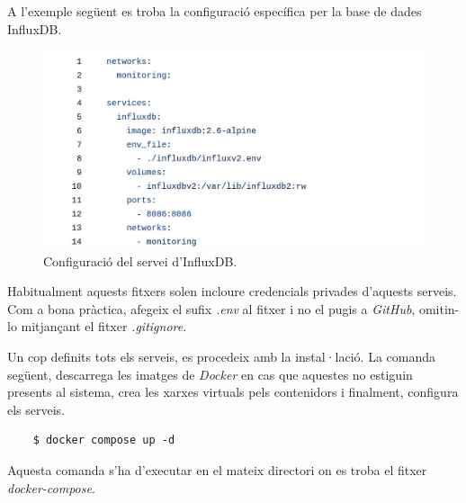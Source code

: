 \clearpage

\noindent
A l'exemple següent es troba la configuració específica per la base de dades InfluxDB.

\begin{figure}[htbp]
    \centerline{\includegraphics[width=\textwidth]{figures/docker-compose-influxdb}}
    \captionsetup{justification=centering}
    \caption{Configuració del servei d'InfluxDB.}\label{fig:docker-compose-influxdb}
\end{figure}

\begin{tcolorbox}[colback=blue!5!white, colframe=blue!75!black, title=Fitxers de configuració]
    Habitualment aquests fitxers solen incloure credencials privades d'aquests serveis.
    Com a bona pràctica, afegeix el sufix \textit{.env} al fitxer i no el pugis a \textit{\gls{GitHub}}, omitin-lo mitjançant el fitxer \textit{.\gls{gitignore}}.
\end{tcolorbox}
\vspace{1em}

\noindent
Un cop definits tots els serveis, es procedeix amb la instal·lació.
La comanda següent, descarrega les imatges de \textit{\gls{Docker}} en cas que aquestes no estiguin presents al sistema,
crea les xarxes virtuals pels contenidors i finalment, configura els serveis.

\begin{verbatim}
    $ docker compose up -d
\end{verbatim}

\begin{tcolorbox}[colback=red!5!white, colframe=red!75!black, title=Atenció]
    Aquesta comanda s'ha d'executar en el mateix directori on es troba el fitxer \textit{\gls{docker-compose}}.
\end{tcolorbox}

